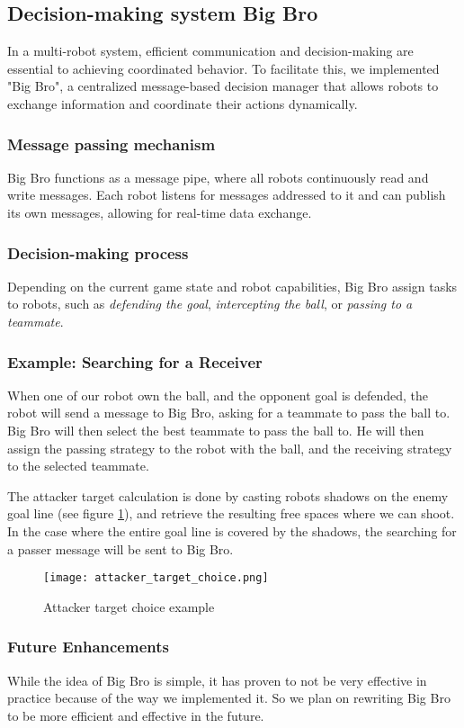 \subsection{Decision-making system Big Bro}

In a multi-robot system, efficient communication and decision-making are essential to achieving coordinated behavior. To facilitate this, we implemented "Big Bro", a centralized message-based decision manager that allows robots to exchange information and coordinate their actions dynamically.  

\subsubsection{Message passing mechanism}

Big Bro functions as a message pipe, where all robots continuously read and write messages. Each robot listens for messages addressed to it and can publish its own messages, allowing for real-time data exchange.

\subsubsection{Decision-making process}

Depending on the current game state and robot capabilities, Big Bro assign tasks to robots, such as \textit{defending the goal}, \textit{intercepting the ball}, or \textit{passing to a teammate}.

\subsubsection{Example: Searching for a Receiver}

When one of our robot own the ball, and the opponent goal is defended, the robot will send a message to Big Bro, asking for a teammate to pass the ball to. Big Bro will then select the best teammate to pass the ball to. He will then assign the passing strategy to the robot with the ball, and the receiving strategy to the selected teammate.

The attacker target calculation is done by casting robots shadows on the enemy goal line (see figure \ref{fig:attacker_target_choice}), and retrieve the resulting free spaces where we can shoot.
In the case where the entire goal line is covered by the shadows, the searching for a passer message will be sent to Big Bro.
\begin{figure}
\centering
    \texttt{[image: attacker\_target\_choice.png]}
    \caption{Attacker target choice example}
    \label{fig:attacker_target_choice}
\end{figure}

\subsubsection{Future Enhancements}

While the idea of Big Bro is simple, it has proven to not be very effective in practice because of the way we implemented it. So we plan on rewriting Big Bro to be more efficient and effective in the future.